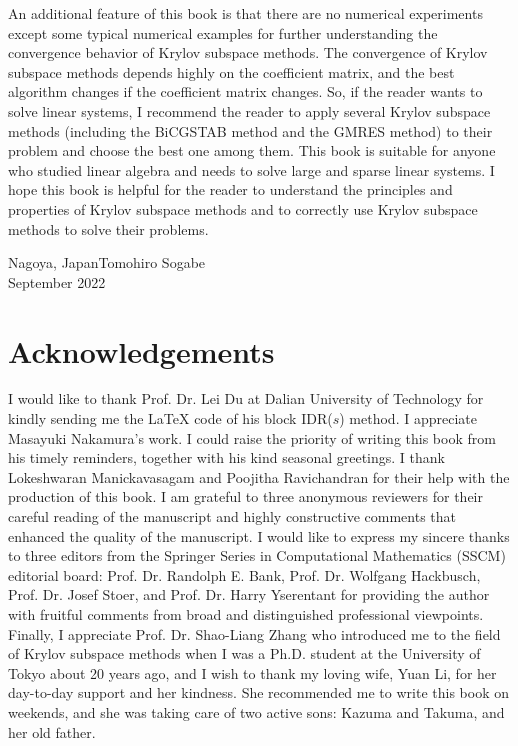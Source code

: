 {An additional feature of this book is that there are no numerical experiments except some typical numerical examples for further understanding the convergence behavior of Krylov subspace methods. The convergence of Krylov subspace methods depends highly on the coefficient matrix, and the best algorithm changes if the coefficient matrix changes. So, if the reader wants to solve linear systems, I recommend the reader to apply several Krylov subspace methods (including the BiCGSTAB method and the GMRES method) to their problem and choose the best one among them.}
{This book is suitable for anyone who studied linear algebra and needs to solve large and sparse linear systems. I hope this book is helpful for the reader to understand the principles and properties of Krylov subspace methods and to correctly use Krylov subspace methods to solve their problems.}
\begin{flushright}
{Nagoya, Japan}\qquad Tomohiro Sogabe\\
{September 2022}
\end{flushright}
\section*{{Acknowledgements}}\label{sec:acknowledgements}
{I would like to thank Prof. Dr. Lei Du at Dalian University of Technology for kindly sending me the LaTeX code of his block IDR($s$) method. I appreciate Masayuki Nakamura's work. I could raise the priority of writing this book from his timely reminders, together with his kind seasonal greetings. I thank Lokeshwaran Manickavasagam and Poojitha Ravichandran for their help with the production of this book. I am grateful to three anonymous reviewers for their careful reading of the manuscript and highly constructive comments that enhanced the quality of the manuscript. I would like to express my sincere thanks to three editors from the Springer Series in Computational Mathematics (SSCM) editorial board: Prof. Dr. Randolph E. Bank, Prof. Dr. Wolfgang Hackbusch, Prof. Dr. Josef Stoer, and Prof. Dr. Harry Yserentant for providing the author with fruitful comments from broad and distinguished professional viewpoints.}
{Finally, I appreciate Prof. Dr. Shao-Liang Zhang who introduced me to the field of Krylov subspace methods when I was a Ph.D. student at the University of Tokyo about 20 years ago, and I wish to thank my loving wife, Yuan Li, for her day-to-day support and her kindness. She recommended me to write this book on weekends, and she was taking care of two active sons: Kazuma and Takuma, and her old father.}
\clearpage
